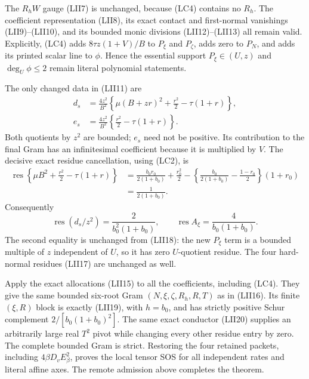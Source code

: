 The $R_hW$ gauge (LII7) is unchanged, because (LC4) contains no
$R_h$.  The coefficient representation (LII8), its exact contact
and first-normal vanishings (LII9)--(LII10), and its bounded monic
divisions (LII12)--(LII13) all remain valid.  Explicitly, (LC4)
adds $8\tau z(1+V)/B$ to $P_\xi$ and $P_\zeta$, adds zero to
$P_N$, and adds its printed scalar line to $\phi$.  Hence the
essential support $P_\xi\in(U,z)$ and $\deg_U\phi\le2$ remain
literal polynomial statements.

The only changed data in (LII11) are
\[
\begin{split}
 d_s&=\frac{4z^2}{B^2}
   \left\{\mu(B+zr)^2+\frac{r^2}{2}-\tau(1+r)\right\},\\
 e_s&=\frac{4z^2}{B^2}
   \left\{\frac{r^2}{2}-\tau(1+r)\right\}.
\end{split}                                             \tag{LC5}
\]
Both quotients by $z^2$ are bounded; $e_s$ need not be positive.
Its contribution to the final Gram has an infinitesimal coefficient
because it is multiplied by $V$.  The decisive exact residue
cancellation, using (LC2), is
\[
 \begin{split}
 \operatorname{res}\left\{
 \mu B^2+\frac{r^2}{2}-\tau(1+r)\right\}
 &=\frac{b_0r_0}{2(1+b_0)}+\frac{r_0^2}{2}
 -\left\{\frac{b_0}{2(1+b_0)}-\frac{1-r_0}{2}\right\}(1+r_0)\\
 &=\frac1{2(1+b_0)}.
 \end{split}                                             \tag{LC6}
\]
Consequently
\[
 \operatorname{res}(d_s/z^2)=\frac2{b_0^2(1+b_0)},\qquad
 \operatorname{res}A_\xi=\frac4{b_0(1+b_0)}.              \tag{LC7}
\]
The second equality is unchanged from (LII18): the new $P_\xi$
term is a bounded multiple of $z$ independent of $U$, so it has
zero $U$-quotient residue.  The four hard-normal residues (LII17)
are unchanged as well.

Apply the exact allocations (LII15) to all the coefficients,
including (LC4).  They give the same bounded six-root Gram
$(N,\xi,\zeta,R_h,R,T)$ as in (LII16).  Its finite $(\xi,R)$
block is exactly (LII19), with $h=b_0$, and has strictly positive
Schur complement $2/[b_0(1+b_0)^2]$.  The same exact conductor
(LII20) supplies an arbitrarily large real $T^2$ pivot while
changing every other residue entry by zero.  The complete bounded
Gram is strict.  Restoring the four retained packets, including
$4\beta D_vE_\beta^2$, proves the local tensor SOS for all
independent rates and literal affine axes.  The remote admission
above completes the theorem.

